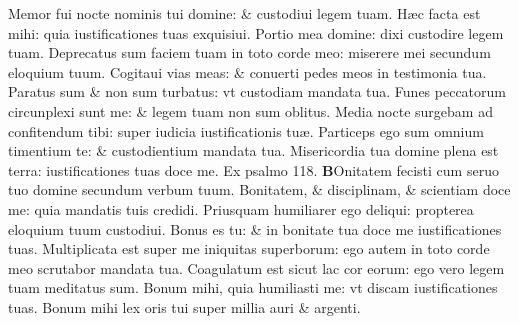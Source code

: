 \documentclass[a5paper,10pt]{book}
\def\ae{æ}
\begin{document}
\begin{multicols*}{2}
\newline \color{red} M\color{black}emor fui nocte nominis tui domine: \& custodiui legem tuam.
\newline \color{red} H\color{black}\ae c facta est mihi: quia iustificationes tuas exquisiui.
\newline \color{red} P\color{black}ortio mea domine: dixi custodire legem tuam.
\newline \color{red} D\color{black}eprecatus sum faciem tuam in toto corde meo: miserere mei secundum eloquium tuum.
\newline \color{red} C\color{black}ogitaui vias meas: \& conuerti pedes meos in testimonia tua.
\newline \color{red} P\color{black}aratus sum \& non sum turbatus: vt custodiam mandata tua.
\newline \color{red} F\color{black}unes peccatorum circunplexi sunt me: \& legem tuam non sum oblitus.
\newline \color{red} M\color{black}edia nocte surgebam ad confitendum tibi: super iudicia iustificationis tu\ae .
\newline \color{red} P\color{black}articeps ego sum omnium timentium te: \& custodientium mandata tua.
\newline \color{red} M\color{black}isericordia tua domine plena est terra: iustificationes tuas doce me. \quad \color{red} Ex psalmo \hypertarget{ps118.5}{118.} \color{black}
\vspace{-1em}
\lettrine[lines=2]{\bfseries \color{red} B}{}Onitatem fecisti cum seruo tuo domine secundum verbum tuum.
\newline \color{red} B\color{black}onitatem, \& disciplinam, \& scientiam doce me: quia mandatis tuis credidi.
\newline \color{red} P\color{black}riusquam humiliarer ego deliqui: propterea eloquium tuum custodiui.
\newline \color{red} B\color{black}onus es tu: \& in bonitate tua doce me iustificationes tuas.
\newline \color{red} M\color{black}ultiplicata est super me iniquitas superborum: ego autem in toto corde meo scrutabor mandata tua.
\newline \color{red} C\color{black}oagulatum est sicut lac cor eorum: ego vero legem tuam meditatus sum.
\newline \color{red} B\color{black}onum mihi, quia humiliasti me: vt discam iustificationes tuas.
\newline \color{red} B\color{black}onum mihi lex oris tui super millia auri \& argenti.

\end{multicols*}
\end{document}
